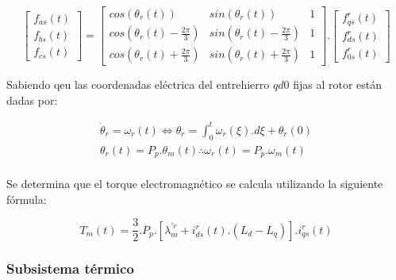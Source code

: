 \documentclass{article}
\begin{document}
    \begin{equation}\label{eq:transformacion_de_park_inversa}
        \begin{bmatrix}
            f_{as}(t)\\
            f_{bs}(t)\\
            f_{cs}(t)
        \end{bmatrix}
        =
        \begin{bmatrix}
            cos(\theta_r(t)) & sin(\theta_r(t)) & 1\\
            cos(\theta_r(t) - \frac{2\pi}{3}) & sin(\theta_r(t) - \frac{2\pi}{3}) & 1\\
            cos(\theta_r(t) + \frac{2\pi}{3}) & sin(\theta_r(t) + \frac{2\pi}{3}) & 1
        \end{bmatrix}.
        \begin{bmatrix}
            f_{qs}^r(t)\\
            f_{ds}^r(t)\\
            f_{0s}^r(t)
        \end{bmatrix}
    \end{equation}

    Sabiendo qeu las coordenadas eléctrica del entrehierro $qd0$ fijas al rotor están dadas por:

    \begin{equation}\label{eq.coordenadas_fijas_al_rotor}
        \begin{aligned}
            \dot{\theta}_r = \omega_r(t) \Leftrightarrow  \theta_r = \int_0^t \omega_r(\xi).d\xi + \theta_r(0)\\
            \theta_r(t) = P_p.\theta_m(t) \therefore \omega_r(t) = P_p.\omega_m(t)\\
        \end{aligned}
    \end{equation}

    Se determina que el torque electromagnético se calcula utilizando la siguiente fórmula:

    \begin{equation}\label{eq.torque_electromagnetico}
        T_{m}(t) = \frac{3}{2}.P_{p}.[\lambda_{m}^{\prime r}+i_{ds}^r(t).(L_{d}-L_{q})].i_{qs}^r(t)
    \end{equation}
        
    \subsubsection{Subsistema térmico} 
    
\end{document}
